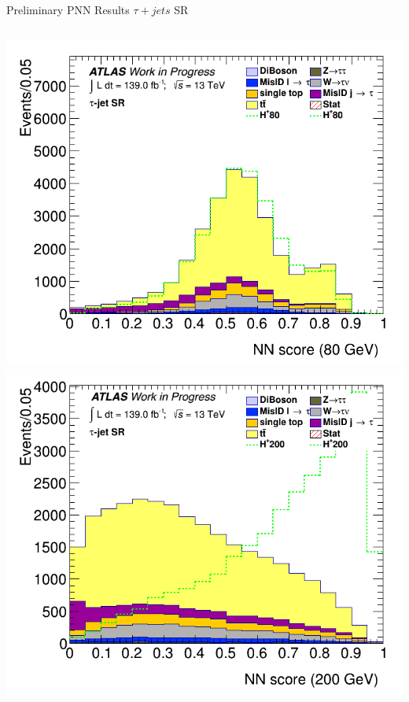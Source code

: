 \documentclass[aspectratio=169,xcolor=table]{beamer}
\begin{document}
      \begin{frame}[t]{Preliminary PNN Results $\tau+jets$ SR}
      \begin{columns}[t]
        \includegraphics[height=.43\textheight,keepaspectratio=true]{Scores/taujet/rnnTest_1p_3p_noweight/clf_score_GB200_mass_80to80_SR_TAUJET.png}
        \includegraphics[height=.43\textheight,keepaspectratio=true]{Scores/taujet/rnnTest_1p_3p_noweight/clf_score_GB200_mass_200to200_SR_TAUJET.png}


\end{columns}
\end{frame}
\end{document}
